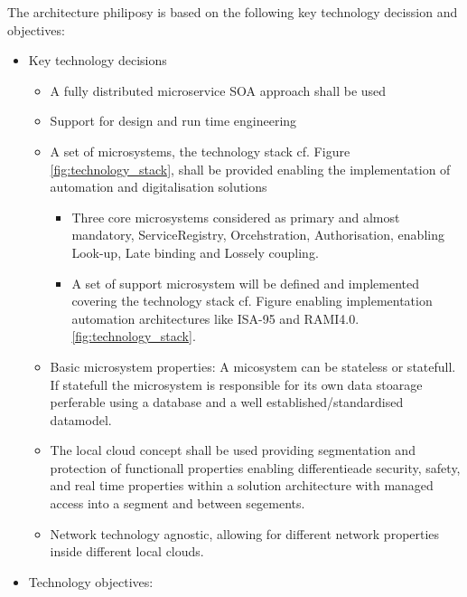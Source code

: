 \documentclass[a4paper]{arrowhead}
\begin{document}
The architecture philiposy is based on the following key technology
decission and objectives:
\begin{itemize}
\item Key technology decisions
  \begin{itemize}
  \item A fully distributed microservice SOA approach shall be used
  \item Support for design and run time engineering

  \item A set of microsystems, the technology stack cf. Figure
    \ref{fig:technology_stack}, shall be provided enabling the
    implementation of automation and digitalisation solutions
    
    \begin{itemize}
    \item Three core microsystems considered as primary and almost
      mandatory, ServiceRegistry, Orcehstration, Authorisation,
      enabling Look-up, Late binding and Lossely coupling.
    \item A set of support microsystem will be defined and implemented
      covering the technology stack cf. Figure enabling implementation
      automation architectures like ISA-95 and RAMI4.0. 
      \ref{fig:technology_stack}.
      \end{itemize}

    \item Basic microsystem properties: A micosystem can be stateless
      or statefull. If statefull the microsystem is responsible for
      its own data stoarage perferable using a database and a well
      established/standardised datamodel.

    \item The local cloud concept shall be used providing segmentation
      and protection of functionall properties enabling differentieade
      security, safety, and real time properties within a solution
      architecture with managed access into a segment and between segements.

    \item Network technology agnostic, allowing for different network
      properties inside different local clouds.

    \end{itemize}
   
  \item Technology objectives: 
   \begin{itemize} 
      

\end{itemize}
\end{itemize}
\end{document}
